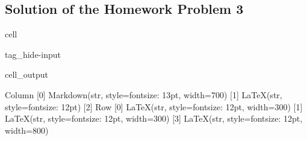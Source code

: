 \documentclass[letterpaper,10pt,english]{jupyterBook}
\begin{document}
\subsection{Solution of the Homework Problem 3}
\label{\detokenize{content/tutorials/T6/tutorial_06:solution-of-the-homework-problem-3}}
\begin{sphinxuseclass}{cell}
\begin{sphinxuseclass}{tag_hide-input}\begin{sphinxVerbatimOutput}

\begin{sphinxuseclass}{cell_output}
\begin{sphinxVerbatim}[commandchars=\\\{\}]
Column
    [0] Markdown(str, style=\PYGZob{}\PYGZsq{}font\PYGZhy{}size\PYGZsq{}: \PYGZsq{}13pt\PYGZsq{}\PYGZcb{}, width=700)
    [1] LaTeX(str, style=\PYGZob{}\PYGZsq{}font\PYGZhy{}size\PYGZsq{}: \PYGZsq{}12pt\PYGZsq{}\PYGZcb{})
    [2] Row
        [0] LaTeX(str, style=\PYGZob{}\PYGZsq{}font\PYGZhy{}size\PYGZsq{}: \PYGZsq{}12pt\PYGZsq{}\PYGZcb{}, width=300)
        [1] LaTeX(str, style=\PYGZob{}\PYGZsq{}font\PYGZhy{}size\PYGZsq{}: \PYGZsq{}12pt\PYGZsq{}\PYGZcb{}, width=300)
    [3] LaTeX(str, style=\PYGZob{}\PYGZsq{}font\PYGZhy{}size\PYGZsq{}: \PYGZsq{}12pt\PYGZsq{}\PYGZcb{}, width=800)
\end{sphinxVerbatim}

\end{sphinxuseclass}\end{sphinxVerbatimOutput}

\end{sphinxuseclass}
\end{sphinxuseclass}
\end{document}
